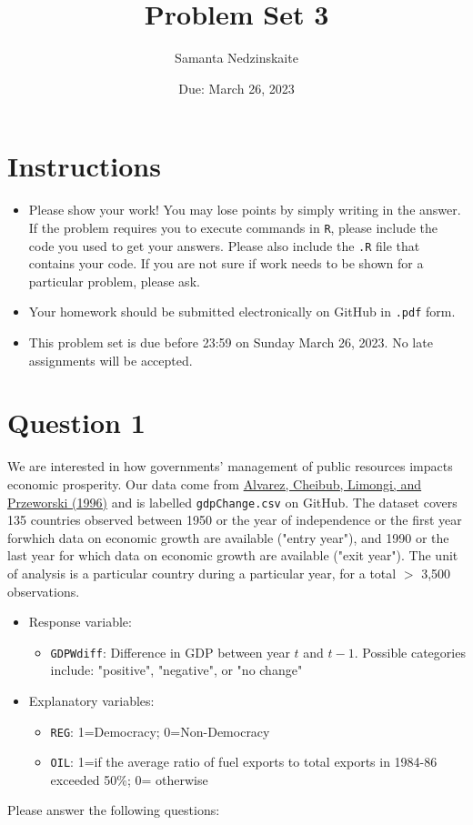 \documentclass[12pt,letterpaper]{article}
\title{Problem Set 3}
\date{Due: March 26, 2023}
\author{Samanta Nedzinskaite}
\begin{document}
	\maketitle
	\section*{Instructions}
	\begin{itemize}
	\item Please show your work! You may lose points by simply writing in the answer. If the problem requires you to execute commands in \texttt{R}, please include the code you used to get your answers. Please also include the \texttt{.R} file that contains your code. If you are not sure if work needs to be shown for a particular problem, please ask.
\item Your homework should be submitted electronically on GitHub in \texttt{.pdf} form.
\item This problem set is due before 23:59 on Sunday March 26, 2023. No late assignments will be accepted.
	\end{itemize}

	\vspace{.25cm}
\section*{Question 1}
\vspace{.25cm}
\noindent We are interested in how governments' management of public resources impacts economic prosperity. Our data come from \href{https://www.researchgate.net/profile/Adam_Przeworski/publication/240357392_Classifying_Political_Regimes/links/0deec532194849aefa000000/Classifying-Political-Regimes.pdf}{Alvarez, Cheibub, Limongi, and Przeworski (1996)} and is labelled \texttt{gdpChange.csv} on GitHub. The dataset covers 135 countries observed between 1950 or the year of independence or the first year forwhich data on economic growth are available ("entry year"), and 1990 or the last year for which data on economic growth are available ("exit year"). The unit of analysis is a particular country during a particular year, for a total $>$ 3,500 observations. 

\begin{itemize}
	\item
	Response variable: 
	\begin{itemize}
		\item \texttt{GDPWdiff}: Difference in GDP between year $t$ and $t-1$. Possible categories include: "positive", "negative", or "no change"
	\end{itemize}
	\item
	Explanatory variables: 
	\begin{itemize}
		\item
		\texttt{REG}: 1=Democracy; 0=Non-Democracy
		\item
		\texttt{OIL}: 1=if the average ratio of fuel exports to total exports in 1984-86 exceeded 50\%; 0= otherwise
	\end{itemize}
	
\end{itemize}
\newpage
\noindent Please answer the following questions:
\end{document}
